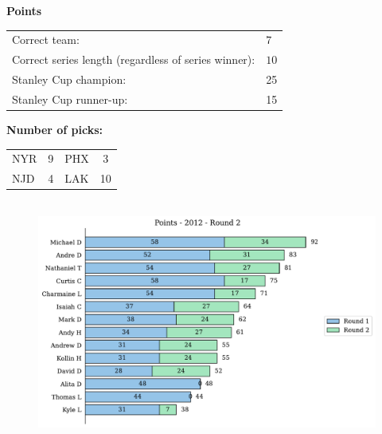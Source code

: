 \documentclass[10pt]{article}
\begin{document}
{\bf Points}\\
\begin{minipage}[t]{12cm}
    \vspace{0pt}
    \begin{tabular}{l l}
        Correct team:	& $7$\\
        Correct series length (regardless of series winner):	& $10$\\
        Stanley Cup champion:	& 25\\
        Stanley Cup runner-up:	& 15\\
    \end{tabular}

    \vspace{0.5cm}
    {\bf Number of picks:}\\
    \begin{tabular}{lc | lc }
        NYR & 9 & PHX & 3 \\
        NJD & 4 & LAK & 10 \\
    \end{tabular}
\end{minipage}
%
\begin{minipage}[t]{13cm}
    \vspace{0pt}
    \begin{figure}[H]
        \vspace{-1cm}
        \includegraphics[width=12cm,height=8cm,keepaspectratio]{../../figures/2012/Points-2012-Round2.pdf}
    \end{figure}
\end{minipage}
\end{document}
